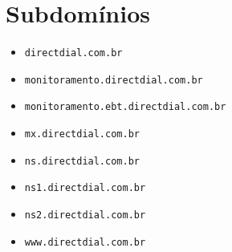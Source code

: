 
\section{Subdomínios}
\begin{multicols}{2}  %
\begin{itemize}
\item \texttt{directdial.com.br}\item \texttt{monitoramento.directdial.com.br}\item \texttt{monitoramento.ebt.directdial.com.br}\item \texttt{mx.directdial.com.br}\item \texttt{ns.directdial.com.br}\item \texttt{ns1.directdial.com.br}\item \texttt{ns2.directdial.com.br}\item \texttt{www.directdial.com.br}
\end{itemize}
\end{multicols}
